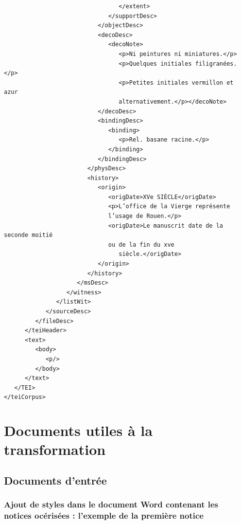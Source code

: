 \documentclass[a4paper,12pt,twoside]{book}
\begin{document}
\begin{verbatim}
                                 </extent>
                              </supportDesc>
                           </objectDesc>
                           <decoDesc>
                              <decoNote>
                                 <p>Ni peintures ni miniatures.</p>
                                 <p>Quelques initiales filigranées.</p>
                                 <p>Petites initiales vermillon et azur
                                 alternativement.</p></decoNote>
                           </decoDesc>
                           <bindingDesc>
                              <binding>
                                 <p>Rel. basane racine.</p>
                              </binding>
                           </bindingDesc>
                        </physDesc>
                        <history>
                           <origin>
                              <origDate>XVe SIÈCLE</origDate>
                              <p>L’office de la Vierge représente 
                              l’usage de Rouen.</p>
                              <origDate>Le manuscrit date de la seconde moitié 
                              ou de la fin du xve
                                 siècle.</origDate>
                           </origin>
                        </history>
                     </msDesc>
                  </witness>
               </listWit>
            </sourceDesc>
         </fileDesc>
      </teiHeader>
      <text>
         <body>
            <p/>
         </body>
      </text>
   </TEI>
</teiCorpus>
	\end{verbatim}
	
	
	\section{Documents utiles à la transformation}
	
	\subsection{Documents d'entrée}
	
	\subsubsection{\label{styles_word}Ajout de styles dans le document Word contenant les notices océrisées : l'exemple de la première notice}
	
	
\end{document}
